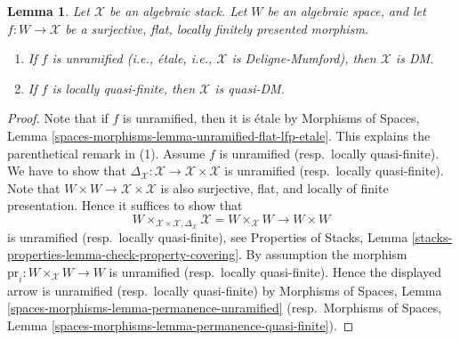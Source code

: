 \documentclass[10pt,a4paper]{amsart}
\theoremstyle{plain}
\newtheorem{lemma}[subsection]{Lemma}
\theoremstyle{definition}
\theoremstyle{remark}
\numberwithin{equation}{subsection}
\begin{document}
\begin{lemma}
\label{lemma-properties-covering-imply-diagonal}
Let $\mathcal{X}$ be an algebraic stack.
Let $W$ be an algebraic space, and let $f : W \to \mathcal{X}$
be a surjective, flat, locally finitely presented morphism.
\begin{enumerate}
\item If $f$ is unramified (i.e., \'etale, i.e., $\mathcal{X}$
is Deligne-Mumford), then $\mathcal{X}$ is DM.
\item If $f$ is locally quasi-finite, then $\mathcal{X}$ is quasi-DM.
\end{enumerate}
\end{lemma}

\begin{proof}
Note that if $f$ is unramified, then it is \'etale by
Morphisms of Spaces, Lemma
\ref{spaces-morphisms-lemma-unramified-flat-lfp-etale}.
This explains the parenthetical remark in (1).
Assume $f$ is unramified (resp.\ locally quasi-finite). We have to show that
$\Delta_\mathcal{X} : \mathcal{X} \to \mathcal{X} \times \mathcal{X}$
is unramified (resp.\ locally quasi-finite). Note that
$W \times W \to \mathcal{X} \times \mathcal{X}$ is also
surjective, flat, and locally of finite presentation. Hence it suffices to
show that
$$
W \times_{\mathcal{X} \times \mathcal{X}, \Delta_\mathcal{X}} \mathcal{X}
=
W \times_\mathcal{X} W
\longrightarrow
W \times W
$$
is unramified (resp.\ locally quasi-finite), see
Properties of Stacks, Lemma
\ref{stacks-properties-lemma-check-property-covering}.
By assumption the morphism $\text{pr}_i : W \times_\mathcal{X} W \to W$
is unramified (resp.\ locally quasi-finite). Hence
the displayed arrow is unramified (resp.\ locally quasi-finite) by
Morphisms of Spaces, Lemma
\ref{spaces-morphisms-lemma-permanence-unramified}
(resp.\ Morphisms of Spaces, Lemma
\ref{spaces-morphisms-lemma-permanence-quasi-finite}).
\end{proof}
\end{document}
